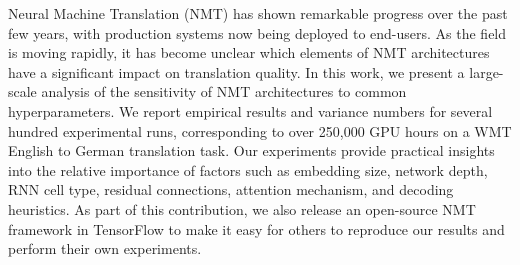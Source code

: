 Neural Machine Translation (NMT) has shown remarkable progress over the past few years, with production systems now being deployed to end-users. As the field is moving rapidly, it has become unclear which elements of NMT architectures have a significant impact on translation quality. In this work, we present a large-scale analysis of the sensitivity of NMT architectures to common hyperparameters. We report empirical results and variance numbers for several hundred experimental runs, corresponding to over 250,000 GPU hours on a WMT English to German translation task. Our experiments provide practical insights into the relative importance of factors such as embedding size, network depth, RNN cell type, residual connections, attention mechanism, and decoding heuristics. As part of this contribution, we also release an open-source NMT framework in TensorFlow to make it easy for others to reproduce our results and perform their own experiments.

